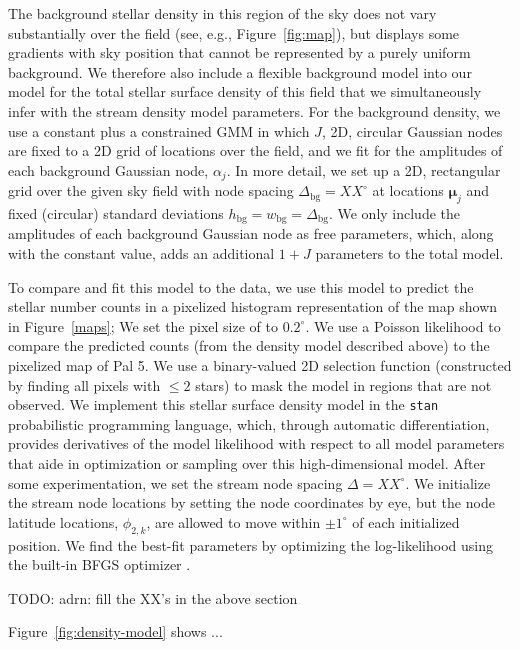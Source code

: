 \documentclass[twocolumn]{aastex62}
\newcommand{\bs}[1]{\boldsymbol{#1}}
\newcommand{\todo}[1]{{\color{red} TODO: #1}}
\begin{document}
The background stellar density in this region of the sky does not vary substantially over the field (see, e.g., Figure~\ref{fig:map}), but displays some gradients with sky position that cannot be represented by a purely uniform background.
We therefore also include a flexible background model into our model for the total stellar surface density of this field that we simultaneously infer with the stream density model parameters.
For the background density, we use a constant plus a constrained GMM in which $J$, 2D, circular Gaussian nodes are fixed to a 2D grid of locations over the field, and we fit for the amplitudes of each background Gaussian node, $\alpha_j$.
In more detail, we set up a 2D, rectangular grid over the given sky field with node spacing $\Delta_{\textrm{bg}} = XX^\circ$ at locations $\bs{\mu}_j$ and fixed (circular) standard deviations $h_{\textrm{bg}} = w_{\textrm{bg}} = \Delta_{\textrm{bg}}$.
We only include the amplitudes of each background Gaussian node as free parameters, which, along with the constant value, adds an additional $1+J$ parameters to the total model.

To compare and fit this model to the data, we use this model to predict the stellar number counts in a pixelized histogram representation of the map shown in Figure~\ref{maps}; We set the pixel size of to $0.2^\circ$.
We use a Poisson likelihood to compare the predicted counts (from the density model described above) to the pixelized map of Pal 5.
We use a binary-valued 2D selection function (constructed by finding all pixels with $\leq 2$ stars) to mask the model in regions that are not observed.
We implement this stellar surface density model in the \texttt{stan} \citep{stan} probabilistic programming language, which, through automatic differentiation, provides derivatives of the model likelihood with respect to all model parameters that aide in optimization or sampling over this high-dimensional model.
After some experimentation, we set the stream node spacing $\Delta = XX^\circ$.
We initialize the stream node locations by setting the node coordinates by eye, but the node latitude locations, $\phi_{2, k}$, are allowed to move within $\pm 1^\circ$ of each initialized position.
We find the best-fit parameters by optimizing the log-likelihood using the built-in BFGS optimizer \citep{Press:2007}.

\todo{adrn: fill the XX's in the above section}

Figure~\ref{fig:density-model} shows ...
\end{document}
